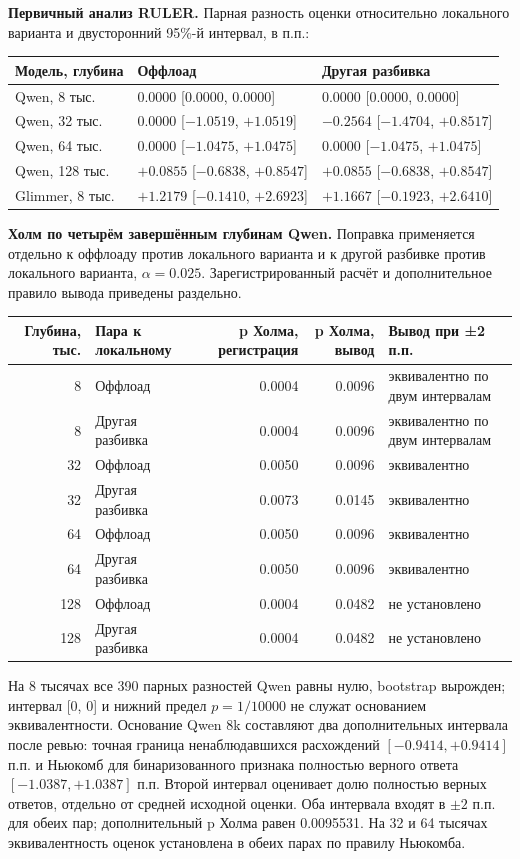 \textbf{Первичный анализ RULER.} Парная разность оценки относительно локального варианта
и двусторонний 95\%-й интервал, в п.п.:
\begin{center}
\begin{tabular}{lll}
\toprule
Модель, глубина & Оффлоад & Другая разбивка \\
\midrule
Qwen, 8 тыс. & 0.0000 [0.0000, 0.0000] & 0.0000 [0.0000, 0.0000] \\
Qwen, 32 тыс. & 0.0000 [$-1.0519$, $+1.0519$] & $-0.2564$ [$-1.4704$, $+0.8517$] \\
Qwen, 64 тыс. & 0.0000 [$-1.0475$, $+1.0475$] & 0.0000 [$-1.0475$, $+1.0475$] \\
Qwen, 128 тыс. & $+0.0855$ [$-0.6838$, $+0.8547$] & $+0.0855$ [$-0.6838$, $+0.8547$] \\
Glimmer, 8 тыс. & $+1.2179$ [$-0.1410$, $+2.6923$] & $+1.1667$ [$-0.1923$, $+2.6410$] \\
\bottomrule
\end{tabular}
\end{center}
\textbf{Холм по четырём завершённым глубинам Qwen.} Поправка применяется отдельно
к оффлоаду против локального варианта и к другой разбивке против локального варианта, $\alpha=0.025$.
Зарегистрированный расчёт и дополнительное правило вывода приведены раздельно.
\begin{center}
\footnotesize
\begin{tabular}{rlrrl}
\toprule
Глубина, тыс. & Пара к локальному & p Холма, регистрация & p Холма, вывод & Вывод при ±2 п.п. \\
\midrule
8 & Оффлоад & 0.0004 & 0.0096 & эквивалентно по двум интервалам \\
8 & Другая разбивка & 0.0004 & 0.0096 & эквивалентно по двум интервалам \\
32 & Оффлоад & 0.0050 & 0.0096 & эквивалентно \\
32 & Другая разбивка & 0.0073 & 0.0145 & эквивалентно \\
64 & Оффлоад & 0.0050 & 0.0096 & эквивалентно \\
64 & Другая разбивка & 0.0050 & 0.0096 & эквивалентно \\
128 & Оффлоад & 0.0004 & 0.0482 & не установлено \\
128 & Другая разбивка & 0.0004 & 0.0482 & не установлено \\
\bottomrule
\end{tabular}
\end{center}
На 8 тысячах все 390 парных разностей Qwen равны нулю, bootstrap вырожден;
интервал [0, 0] и нижний предел $p=1/10000$ не служат основанием эквивалентности.
Основание Qwen 8k составляют два дополнительных интервала после ревью:
точная граница ненаблюдавшихся расхождений $[-0.9414,+0.9414]$ п.п.
и Ньюкомб для бинаризованного признака полностью верного ответа $[-1.0387,+1.0387]$ п.п.
Второй интервал оценивает долю полностью верных ответов, отдельно от средней исходной оценки.
Оба интервала входят в $\pm2$ п.п. для обеих пар; дополнительный p Холма равен 0.0095531.
На 32 и 64 тысячах эквивалентность оценок установлена в обеих парах по правилу Ньюкомба.

